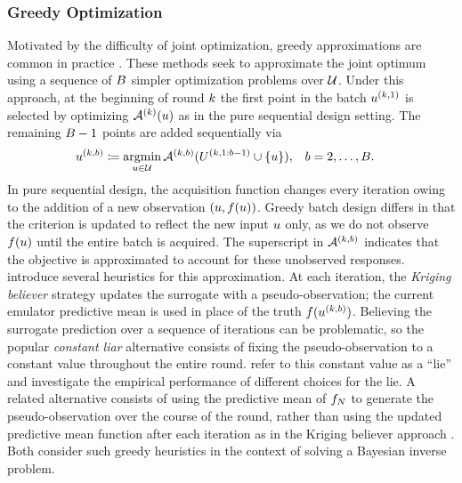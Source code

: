 \documentclass[12pt]{article}
\begin{document}
\subsubsection{Greedy Optimization} \label{sec:greedy-opt}
Motivated by the difficulty of joint optimization, greedy approximations are common in practice \citep{Ginsbourger2010}.
These methods seek to approximate the joint optimum using a sequence of $\Nbatch$ simpler optimization 
problems over $\parSpace$. Under this approach, at the beginning of round $\designIndex$ the first 
point in the batch $\Par^{(\designIndex,1)}$ is selected by optimizing $\acq[]^{(\designIndex)}(\Par)$ as 
in the pure sequential design setting. The remaining $\Nbatch - 1$ points are added sequentially via
\begin{align}
&\Par^{(\designIndex, b)} \Def \argmin_{\Par \in \parSpace} \acq[]^{(\designIndex,b)}(\parMat^{(\designIndex,1:b-1)} \cup \{\Par\}),
&&b = 2, \dots, \Nbatch. 
\label{eq:greedy-acq-opt}
\end{align}
In pure sequential design, the acquisition function changes every iteration owing to the addition of a new
observation $(\Par, \func(\Par))$. Greedy batch design differs in that the criterion is updated to reflect
the new input $\Par$ only, as we do not observe $\func(\Par)$ until the entire batch is acquired.
The superscript in $\acq[]^{(\designIndex,b)}$ indicates that the objective is approximated to account for
these unobserved responses. \citep{Ginsbourger2010} introduce several heuristics for this approximation.
At each iteration, the \textit{Kriging believer} strategy updates the surrogate with a pseudo-observation;
the current emulator predictive mean is used in place of the truth $\func(\Par^{(\designIndex, b)})$.
Believing the surrogate prediction over a sequence of iterations can be problematic, so the popular 
\textit{constant liar} alternative consists of fixing the pseudo-observation to a constant value throughout the 
entire round. \citep{Ginsbourger2010} refer to this constant value as a ``lie'' and investigate the empirical 
performance of different choices for the lie. A related alternative consists of using the predictive mean of 
$\funcEm[\Ndesign]$ to generate the pseudo-observation over the course of the round, rather than using the 
updated predictive mean function after each iteration as in the Kriging believer approach \citep{VehtariParallelGP}.
Both \citep{VehtariParallelGP,Surer2023sequential} consider such greedy heuristics in the context of
solving a Bayesian inverse problem.
\end{document}
